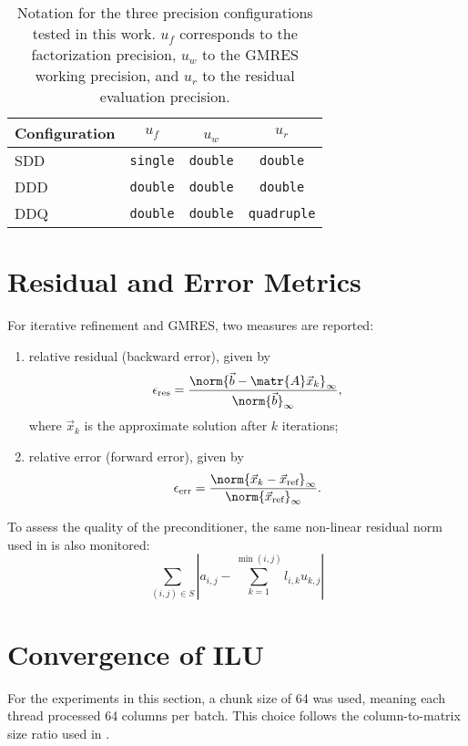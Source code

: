 \begin{table}[h]
  \centering
  \begin{tabular}{lccc}
    \toprule
    Configuration & \(u_f\)    & \(u_w\) ​   & \(u_r\)       \\
    \midrule
    SDD           & \texttt{single} & \texttt{double} & \texttt{double}    \\
    DDD           & \texttt{double} & \texttt{double} & \texttt{double}    \\
    DDQ           & \texttt{double} & \texttt{double} & \texttt{quadruple} \\
    \bottomrule
  \end{tabular}
  \caption[Precision configurations for mixed-precision IR]{Notation for the three
    precision configurations tested in this work. \(u_f\) corresponds to the
    factorization precision, \(u_w\) to the GMRES working precision, and \(u_r\)
    to the residual evaluation precision.}
  \label{tab:notation}
\end{table}


\section{Residual and Error Metrics}
\label{sec:resid-error-metr}

For iterative refinement and GMRES, two measures are reported:
\begin{enumerate}
\item relative residual (backward error), given by \[\epsilon_{\text{res}} =
    \frac{\norm{\vec{b} - \matr{A} \vec{x}_k}_{\infty}}{\norm{\vec{b}}_{\infty}},\] where \(\vec{x}_k\) is the approximate solution
  after \(k\) iterations;
\item relative error (forward error), given by \[\epsilon_{\text{err}} = \frac{\norm{\vec{x}_k -
        \vec{x}_{\text{ref}}}_{\infty}}{\norm{\vec{x}_{\text{ref}}}_{\infty}}.\]
\end{enumerate}

To assess the quality of the preconditioner, the same non-linear residual norm
used in \cite{chow_fine-grained_2015} is also monitored: \[ \sum_{(i,j) \in S}
  \left| a_{i,j} - \sum_{k=1}^{\min(i,j)} l_{i,k}u_{k,j} \right| \]

\section{Convergence of ILU}
\label{sec:convergence-ilu}

For the experiments in this section, a chunk size of 64 was used, meaning each
thread processed 64 columns per batch. This choice follows the column-to-matrix
size ratio used in \cite{chow_fine-grained_2015}.

